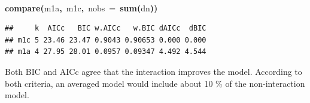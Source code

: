 \documentclass{article}
\makeatletter
\newcommand{\hlfunctioncall}[1]{\textcolor[rgb]{.5,0,.33}{\textbf{#1}}}%
\newcommand{\hlkeyword}[1]{\textbf{#1}}%
\newcommand{\hlargument}[1]{\textcolor[rgb]{.69,.25,.02}{#1}}%
\newcommand{\hlsymbol}[1]{#1}%
\newcommand{\hlstd}[1]{\textcolor[rgb]{0,0,0}{#1}}%
\newenvironment{kframe}{%
 \def\FrameCommand##1{\hskip\@totalleftmargin \hskip-\fboxsep
 \colorbox{shadecolor}{##1}\hskip-\fboxsep
     \hskip-\linewidth \hskip-\@totalleftmargin \hskip\columnwidth}%
 \MakeFramed {\advance\hsize-\width
   \@totalleftmargin\z@ \linewidth\hsize
   \@setminipage}}%
 {\par\unskip\endMakeFramed}
\newenvironment{knitrout}{}{} %
\makeatother
\begin{document}
\begin{knitrout}
{\begin{kframe}
\begin{flushleft}
\hlstd{}\hspace*{\fill}\\
\hlstd{}\hlfunctioncall{compare}\hlkeyword{(}\hlsymbol{m1a}\hlkeyword{,}{\ }\hlsymbol{m1c}\hlkeyword{,}{\ }\hlargument{nobs}{\ }\hlargument{=}{\ }\hlfunctioncall{sum}\hlkeyword{(}\hlsymbol{d}\hlkeyword{\usebox{\hlnormalsizeboxdollar}}\hlsymbol{n}\hlkeyword{)}\hlkeyword{)}\mbox{}
\normalfont
\end{flushleft}
\begin{verbatim}
##     k  AICc   BIC w.AICc   w.BIC dAICc  dBIC
## m1c 5 23.46 23.47 0.9043 0.90653 0.000 0.000
## m1a 4 27.95 28.01 0.0957 0.09347 4.492 4.544
\end{verbatim}
\end{kframe}}
\end{knitrout}


Both BIC and AICc agree that the interaction improves the model. 
According to both criteria, an averaged model would include about 10 \% of the non-interaction model. 
\end{document}
